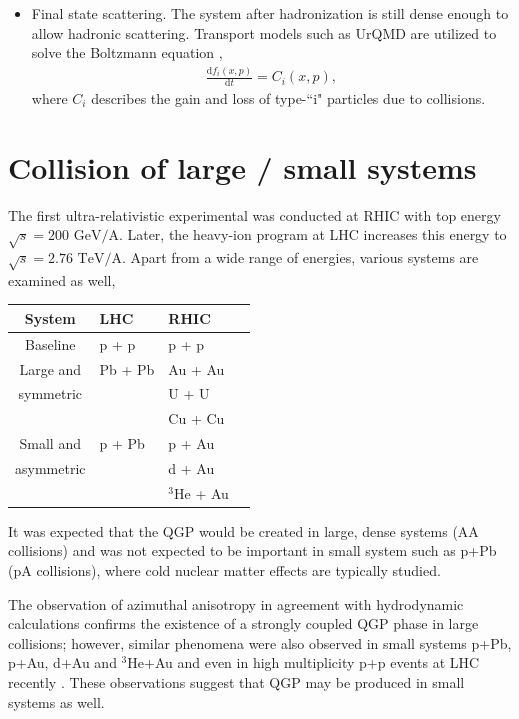 \documentclass[aps,prl,twocolumn,groupedaddress]{revtex4-1}
\begin{document}
\begin{itemize}
		\item Final state scattering. 
		The system after hadronization is still dense enough to allow hadronic scattering. 
		Transport models such as UrQMD are utilized to solve the Boltzmann equation \citep{Bass:1998ca, Bleicher:1999xi},
		\begin{eqnarray}
			\frac{\mathrm{d}f_i(x, p)}{\mathrm{d}t} = C_i(x, p),
		\end{eqnarray}
	where $C_i$ describes the gain and loss of type-``i" particles due to collisions. 
	\end{itemize}
	


\section{Collision of large / small systems}
The first ultra-relativistic experimental was conducted at RHIC with top energy $\sqrt{s} = 200 \textrm{ GeV/A}$. 
Later, the heavy-ion program at LHC increases this energy to $\sqrt{s} = 2.76 \textrm{ TeV/A}$. 
Apart from a wide range of energies, various systems are examined as well,
\begin{center}
	\begin{tabularx}{0.5\textwidth}{c *{3}{Y}}
	\toprule[1pt]
	System 		& LHC 		 &	RHIC\\
	\midrule[0.5pt]
	Baseline	 	& p + p		 & 	 p + p \\
	\midrule[0.5pt]
	Large and		 	& Pb + Pb	 & 	 Au + Au \\
	symmetric		 	&			 & 	 U + U \\
			 	&			 & 	 Cu + Cu \\
	\midrule[0.5pt]
	Small and 	& p + Pb	 	 & 	 p + Au \\
	asymmetric		 	&			 & 	 d + Au \\
			 	&			 & 	 ${}^3$He + Au \\
	\bottomrule[1pt]
	\end{tabularx}
\end{center}
It was expected that the QGP would be created in large, dense systems (AA collisions) and was not expected to be important in small system such as p+Pb (pA collisions), where cold nuclear matter effects are typically studied.

The observation of azimuthal anisotropy in agreement with hydrodynamic calculations confirms the existence of a strongly coupled QGP phase in large collisions; however, similar phenomena were also observed in small systems p+Pb, p+Au, d+Au and ${}^3$He+Au and even in high multiplicity p+p events at LHC recently  \citep{Loizides:2016tew, Adare:2014keg, Adare:2015ctn, CMS:2015waa, ALICE:2014mda}. These observations suggest that QGP may be produced in small systems as well.
\end{document}
